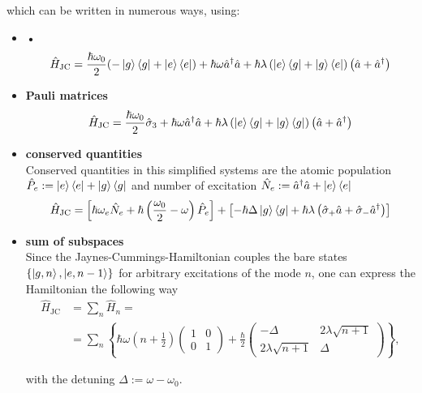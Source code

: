 \documentclass{article}
\newcommand{\lr}[1]{\left(#1\right)}
\newcommand{\lreck}[1]{\left[#1\right]}
\newcommand{\lrschweif}[1]{\left\{#1\right\}}
\begin{document}
which can be written in numerous ways, using:
\begin{itemize}
	\item \textbf{•}
		\begin{equation}
			\hat{H}_\text{JC} = \frac{\hbar\omega_0}{2} ( - \ket{g}\bra{g} + \ket{e}\bra{e} )
		+
		\hbar\omega \hat{a}^\dagger\hat{a} 
		+
		\hbar\lambda \lr{ \ket{e}\bra{g} + \ket{g}\bra{e} } \lr{ \hat{a} + \hat{a}^\dagger }
		\end{equation}
	\item \textbf{Pauli matrices}\\
		\begin{equation}
			\hat{H}_\text{JC} = \frac{\hbar\omega_0}{2} \hat{\sigma}_3
			+
			\hbar\omega \hat{a}^\dagger\hat{a}
			+
			\hbar\lambda \lr{ \ket{e}\bra{g} + \ket{g}\bra{g} } \lr{ \hat{a} + \hat{a}^\dagger }
		\end{equation}
	
	
	
	\item \textbf{conserved quantities}\\
	Conserved quantities in this simplified systems are the atomic population $\hat{P}_e := \ket{e}\bra{e} + \ket{g}\bra{g}$ and number of excitation $\hat{N}_e := \hat{a}^\dagger\hat{a} + \ket{e}\bra{e}$
		\begin{equation}
			\hat{H}_\text{JC} = \lreck{ \hbar\omega_e \hat{N}_e + \hbar\lr{ \frac{\omega_0}{2} - \omega } \hat{P}_e } + \lreck{ -\hbar \Delta \ket{g}\bra{g} + \hbar\lambda \lr{ \hat{\sigma}_+ \hat{a} + \hat{\sigma}_- \hat{a}^\dagger } }
		\end{equation}
	
	
	\item \textbf{sum of subspaces}\\
	Since the Jaynes-Cummings-Hamiltonian couples the bare states $\{\ket{g,n}, \ket{e,n-1}\}$ for arbitrary excitations of the mode $n$, one can express the Hamiltonian the following way
		\begin{align}
			\hat{H}_\text{JC} &= \sum_n \hat{H}_n = \\
			&= \sum_n \lrschweif{ \hbar\omega\lr{ n + \frac{1}{2} }
		\begin{pmatrix}
			1 & 0 \\
			0 & 1
		\end{pmatrix}
		+
		\frac{\hbar}{2}
		\begin{pmatrix}
			-\Delta & 2\lambda\sqrt{ n+1 } \\
			2\lambda\sqrt{ n+1 } & \Delta
		\end{pmatrix}
		 },
		\end{align}
	
	with the detuning $\Delta := \omega - \omega_0$.
\end{itemize}
\end{document}
